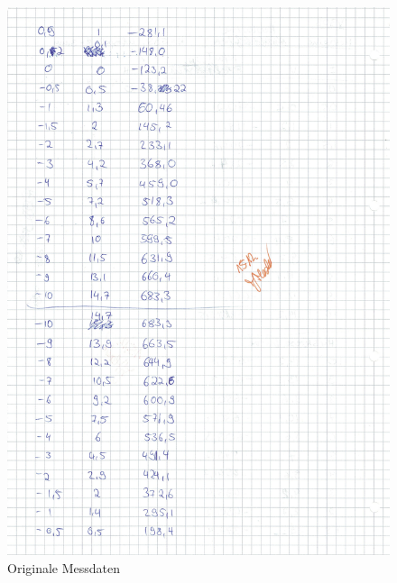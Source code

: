 \begin{figure}[h!]
  \centering
  \includegraphics[width=\textwidth]{OMD2.pdf}
  \caption{Originale Messdaten}
  \label{fig:OMD2}
\end{figure}

